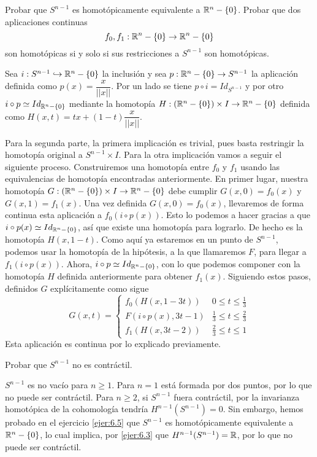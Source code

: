 \documentclass[twoside]{article}
\begin{document}
\begin{ejercicio}{6.5}
Probar que $S^{n-1}$ es homotópicamente equivalente a $\mathbb{R}^n-\{0\}$. Probar que dos aplicaciones continuas
\[
f_0,f_1:\mathbb{R}^n-\{0\}\to\mathbb{R}^n-\{0\}
\]
son homotópicas si y solo si sus restricciones a $S^{n-1}$ son homotópicas.
\end{ejercicio}
\begin{solucion}
Sea $i:S^{n-1}\hookrightarrow \mathbb{R}^n-\{0\}$ la inclusión y sea $p:\mathbb{R}^n-\{0\}\to S^{n-1}$ la aplicación definida como $p(x)=\dfrac{x}{||x||}$. Por un lado se tiene $p\circ i=Id_{S^{n-1}}$ y por otro $i\circ p\simeq Id_{\mathbb{R}^n-\{0\}}$ mediante la homotopía $H:(\mathbb{R}^n-\{0\})\times I\to \mathbb{R}^n-\{0\}$ definida como $H(x,t)=tx+(1-t)\dfrac{x}{||x||}$. 

Para la segunda parte, la primera implicación es trivial, pues basta restringir la homotopía original a $S^{n-1}\times I$. Para la otra implicación vamos a seguir el siguiente proceso. Construiremos una homotopía entre $f_0$ y $f_1$ usando las equivalencias de homotopía encontradas anteriormente. En primer lugar, nuestra homotopía $G:(\mathbb{R}^n-\{0\})\times I\to \mathbb{R}^n-\{0\}$ debe cumplir $G(x,0)=f_0(x)$ y $G(x,1)=f_1(x)$. Una vez definida $G(x,0)=f_0(x)$, llevaremos de forma continua esta aplicación a $f_0(i\circ p(x))$.  Esto lo podemos a hacer gracias a que $i\circ p(x)\simeq Id_{\mathbb{R}^n-\{0\}}$, así que existe una homotopía para lograrlo. De hecho es la homotopía $H(x,1-t)$. Como aquí ya estaremos en un punto de $S^{n-1}$, podemos usar la homotopía de la hipótesis, a la que llamaremos $F$, para llegar a $f_1(i\circ p(x))$. Ahora, $i\circ p \simeq Id_{\mathbb{R}^n-\{0\}}$, con lo que podemos componer con la homotopía $H$ definida anteriormente para obtener $f_1(x)$. Siguiendo estos pasos, definidos $G$ explícitamente como sigue
\[
G(x,t)=\begin{cases}
f_0(H(x,1-3t)) & 0\leq t\leq \frac{1}{3}\\
F(i\circ p(x), 3t-1) & \frac{1}{3}\leq t\leq\frac{2}{3}\\
f_1(H(x, 3t-2)) & \frac{2}{3}\leq t\leq 1
\end{cases}
\]
Esta aplicación es continua por lo explicado previamente.
\end{solucion}

\newpage

\begin{ejercicio}{6.6}
Probar que $S^{n-1}$ no es contráctil.
\end{ejercicio}
\begin{solucion}
$S^{n-1}$ es no vacío para $n\geq 1$. Para $n=1$ está formada por dos puntos, por lo que no puede ser contráctil. Para $n\geq 2$, si $S^{n-1}$ fuera contráctil, por la invarianza homotópica de la cohomología tendría $H^{n-1}(S^{n-1})=0$. Sin embargo, hemos probado en el ejercicio \ref{ejer:6.5} que $S^{n-1}$ es homotópicamente equivalente a $\mathbb{R}^n-\{0\}$, lo cual implica, por \ref{ejer:6.3} que $H^{n-1}(S^{n-1})=\mathbb{R}$, por lo que no puede ser contráctil. 
\end{solucion}
\end{document}
